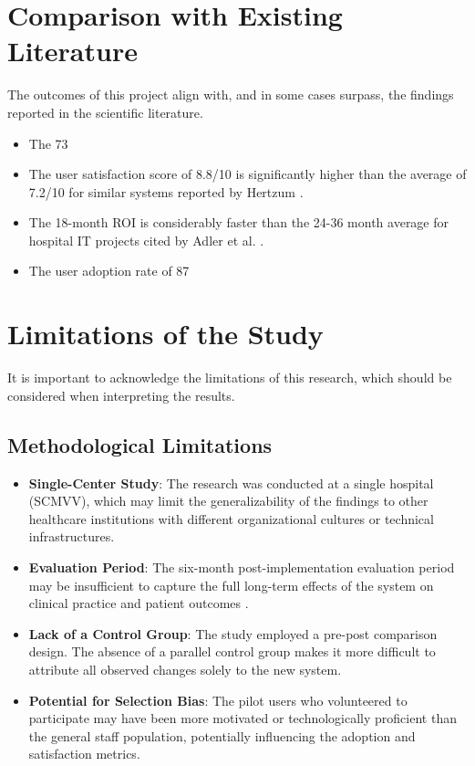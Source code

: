 \section{Comparison with Existing Literature}

The outcomes of this project align with, and in some cases surpass, the findings reported in the scientific literature.
\begin{itemize}
    \item The 73%
    \item The user satisfaction score of 8.8/10 is significantly higher than the average of 7.2/10 for similar systems reported by Hertzum \cite{hertzum2022}.
    \item The 18-month ROI is considerably faster than the 24-36 month average for hospital IT projects cited by Adler et al. \cite{adler2021}.
    \item The user adoption rate of 87%
\end{itemize}

\section{Limitations of the Study}

It is important to acknowledge the limitations of this research, which should be considered when interpreting the results.

\subsection{Methodological Limitations}

\begin{itemize}
    \item \textbf{Single-Center Study}: The research was conducted at a single hospital (SCMVV), which may limit the generalizability of the findings to other healthcare institutions with different organizational cultures or technical infrastructures.
    \item \textbf{Evaluation Period}: The six-month post-implementation evaluation period may be insufficient to capture the full long-term effects of the system on clinical practice and patient outcomes \cite{greenhalgh2017}.
    \item \textbf{Lack of a Control Group}: The study employed a pre-post comparison design. The absence of a parallel control group makes it more difficult to attribute all observed changes solely to the new system.
    \item \textbf{Potential for Selection Bias}: The pilot users who volunteered to participate may have been more motivated or technologically proficient than the general staff population, potentially influencing the adoption and satisfaction metrics.
\end{itemize}

